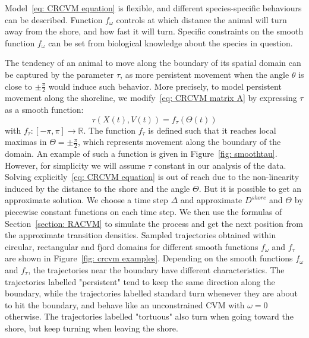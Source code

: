 \documentclass[aoas]{imsart}
\theoremstyle{definition}
\theoremstyle{remark}
\theoremstyle{remark}
\newcommand {\R}{\mathbb{R}}
\newcommand {\1}{\mathbb{1}}
\begin{document}
Model~\eqref{eq: CRCVM equation} is flexible, and different species-specific behaviours can be described. Function $f_{\omega}$ controls at which distance the animal will turn away from the shore, and how fast it will turn.  Specific constraints on the smooth function $f_{\omega}$ can be set from biological knowledge about the species in question. 

The tendency of an animal to move along the boundary of its spatial domain can be captured by the parameter $\tau$, as more persistent movement when the angle $\theta$ is close to $\pm\frac{\pi}{2}$ would induce such behavior. More precisely, to model persistent movement along the shoreline, we modify~\eqref{eq: CRCVM matrix A} by expressing $\tau$ as a smooth function:
\[\tau(X(t),V(t))=f_{\tau}(\Theta(t))\] with $f_{\tau}:[-\pi,\pi] \longrightarrow \R$.
The function $f_{\tau}$ is defined such that it reaches local maximas in $\Theta=\pm\frac{\pi}{2}$, which represents movement along the boundary of the domain. An example of such a function is given in Figure~\ref{fig: smoothtau}. However, for simplicity we will assume $\tau$ constant in our analysis of the data.\\


Solving explicitly~\eqref{eq: CRCVM equation} is out of reach due to the non-linearity induced by the distance to the shore and the angle $\Theta$. But it is possible to get an approximate solution. We choose a time step $\Delta$ and approximate $D^{shore}$ and $\Theta$ by piecewise constant functions on each time step. We then use the formulas of Section~\ref{section: RACVM} to simulate the process and get the next position from the approximate transition densities. Sampled trajectories obtained within circular, rectangular and fjord domains for different smooth functions $f_{\omega}$ and $f_{\tau}$ are shown in Figure~\ref{fig: crcvm examples}. Depending on the smooth functions $f_{\omega}$ and $f_{\tau}$, the trajectories near the boundary have different characteristics. The trajectories labelled "persistent" tend to keep the same direction along the boundary, while the trajectories labelled standard turn whenever they are about to hit the boundary, and behave like an unconstrained CVM with $\omega=0$ otherwise.  The trajectories labelled "tortuous" also turn when going toward the shore, but keep turning when leaving the shore.\\
\end{document}

